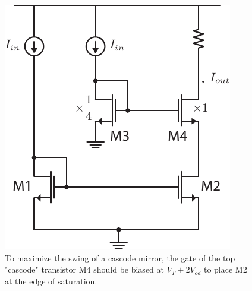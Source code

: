 \begin{figure}[tb]
\centering
\includegraphics[scale=1]{mirror_cascode_hiswing.pdf}
\caption{To maximize the swing of a cascode mirror, the gate of the top "cascode" transistor M4 should be biased at $V_T + 2 V_{od}$ to place M2 at the edge of saturation.}
\label{fig:cascode_hiswing}
\end{figure}
\newpage
